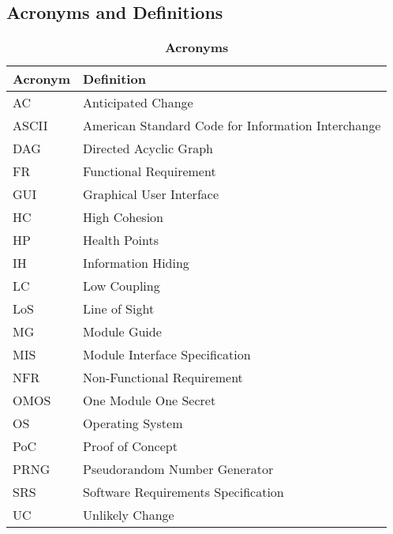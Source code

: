 \documentclass[12pt, titlepage]{article}
\begin{document}
    \subsection{Acronyms and Definitions}
        \begin{table}[H]
            \centering
            \caption{\bf Acronyms}
            \label{TableAcronym}
            \bigskip
            \def\arraystretch{1.5}
            \begin{tabularx}{\textwidth}{p{3.7cm}X}
                \toprule
                \textbf{Acronym} & \textbf{Definition} \\
                \midrule
                AC & Anticipated Change\\
                ASCII & American Standard Code for Information Interchange\\
                DAG & Directed Acyclic Graph\\
                FR & Functional Requirement\\
                GUI & Graphical User Interface\\
                HC & High Cohesion\\
                HP & Health Points\\
                IH & Information Hiding\\
                LC & Low Coupling\\
                LoS & Line of Sight\\
                MG & Module Guide\\
                MIS & Module Interface Specification\\
                NFR & Non-Functional Requirement\\
                OMOS & One Module One Secret\\
                OS & Operating System\\
                PoC & Proof of Concept\\
                PRNG & Pseudorandom Number Generator\\ 
                SRS & Software Requirements Specification\\
                UC & Unlikely Change\\
            \bottomrule
            \end{tabularx}
        \end{table}
\end{document}
